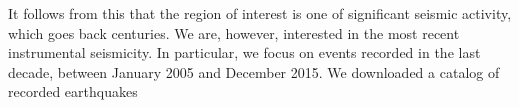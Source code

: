 It follows from this that the region of interest is one of significant seismic activity, which goes back centuries. We are, however, interested in the most recent instrumental seismicity. In particular, we focus on events recorded in the last decade, between January 2005 and December 2015. We downloaded a catalog of recorded earthquakes 










